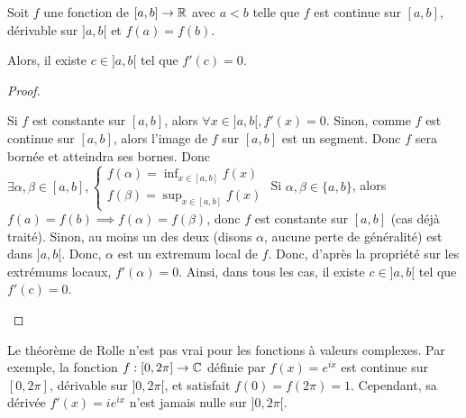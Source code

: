 \documentclass[12pt, a4paper]{report}
\begin{document}
\begin{theorem}
  Soit $f$ une fonction de $[a,b]\to\mathbb{R}$ avec $a < b$ telle que $f$ est continue sur $[a,b]$, dérivable sur $]a,b[$ et $f(a) = f(b)$.

  Alors, il existe $c \in ]a,b[$ tel que $f'(c) = 0$.
\end{theorem}

\begin{proof}
  \begin{outline}
    \1 Si $f$ est constante sur $[a,b]$, alors $\forall x \in ]a,b[, f'(x) = 0$.
    \1 Sinon, comme $f$ est continue sur $[a,b]$, alors l'image de $f$ sur $[a,b]$ est un segment. Donc $f$ sera bornée et atteindra ses bornes.
    \2 Donc $\exists \alpha,\beta \in [a,b], \begin{cases}
      f(\alpha) = \inf_{x\in[a,b]} f(x) \\
      f(\beta) = \sup_{x\in[a,b]} f(x)
    \end{cases}$
    \2 Si $\alpha,\beta \in \{a,b\}$, alors $f(a)=f(b)\implies f(\alpha)=f(\beta)$, donc $f$ est constante sur $[a,b]$ (cas déjà traité).
    \2 Sinon, au moins un des deux (disons $\alpha$, aucune perte de généralité) est dans $]a,b[$.
    \3 Donc, $\alpha$ est un extremum local de $f$.
    \3 Donc, d'après la propriété sur les extrémums locaux, $f'(\alpha) = 0$.
    \1 Ainsi, dans tous les cas, il existe $c \in ]a,b[$ tel que $f'(c) = 0$.
  \end{outline}
\end{proof}

\begin{remark}
  Le théorème de Rolle n'est pas vrai pour les fonctions à valeurs complexes. Par exemple, la fonction $f : [0, 2\pi] \to \mathbb{C}$ définie par $f(x) = e^{ix}$ est continue sur $[0, 2\pi]$, dérivable sur $]0, 2\pi[$, et satisfait $f(0) = f(2\pi) = 1$. Cependant, sa dérivée $f'(x) = ie^{ix}$ n'est jamais nulle sur $]0, 2\pi[$.
\end{remark}
\end{document}
